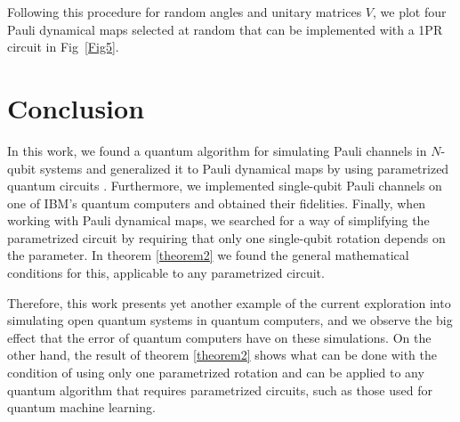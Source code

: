 \documentclass[10pt,letterpaper]{article} %
\newcommand{\fref}[1]{Fig~\ref{#1}}
\begin{document}
Following this procedure for random
angles and unitary matrices $V$, 
we plot four Pauli dynamical maps  selected at random
that can be implemented with a 1PR circuit in \fref{Fig5}. 

\section{Conclusion} %


In this work, we found a quantum algorithm for 
simulating Pauli channels in $N$-qubit systems and
generalized it to Pauli dynamical maps
by using parametrized quantum circuits .
Furthermore, we implemented single-qubit Pauli channels
on one of IBM's quantum computers
and obtained their fidelities. 
Finally, when working with Pauli dynamical maps,
we searched for a way of simplifying the parametrized circuit 
by requiring that only one single-qubit rotation depends on the parameter.
In theorem \ref{theorem2} we found the general mathematical conditions for 
this, applicable to any parametrized circuit.

Therefore, this work presents yet another example of the current
exploration into simulating open quantum
systems in quantum computers,
and we observe the big effect that the error of quantum computers have
on these simulations. 
On the other hand, the result
of theorem \ref{theorem2}
shows what can be done with the condition of using only one
parametrized rotation and
can be applied to any quantum algorithm that requires parametrized circuits,
such as those used for quantum machine learning. 
\end{document}
